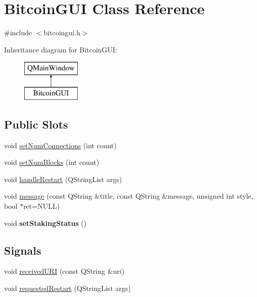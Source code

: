 \hypertarget{class_bitcoin_g_u_i}{}\section{Bitcoin\+G\+UI Class Reference}
\label{class_bitcoin_g_u_i}


{\ttfamily \#include $<$bitcoingui.\+h$>$}

Inheritance diagram for Bitcoin\+G\+UI\+:\begin{figure}[H]
\begin{center}
\leavevmode
\includegraphics[height=2.000000cm]{class_bitcoin_g_u_i}
\end{center}
\end{figure}
\subsection*{Public Slots}
\begin{DoxyCompactItemize}
\item 
void \mbox{\hyperlink{class_bitcoin_g_u_i_ae5b9dc62c6a52764a92cfacbe128626f}{set\+Num\+Connections}} (int count)
\item 
void \mbox{\hyperlink{class_bitcoin_g_u_i_ad9c5016f37aa52562c114527a63a2563}{set\+Num\+Blocks}} (int count)
\item 
void \mbox{\hyperlink{class_bitcoin_g_u_i_a0f9d1262e45413fa51a395d41f615917}{handle\+Restart}} (Q\+String\+List args)
\item 
void \mbox{\hyperlink{class_bitcoin_g_u_i_abf1d036341d1fb122398b2b78d2734ea}{message}} (const Q\+String \&title, const Q\+String \&message, unsigned int style, bool $\ast$ret=N\+U\+LL)
\item 
\mbox{\label{class_bitcoin_g_u_i_ae512b4ad46f9cba31be53de5a5c1d398}} 
void {\bfseries set\+Staking\+Status} ()
\end{DoxyCompactItemize}
\subsection*{Signals}
\begin{DoxyCompactItemize}
\item 
void \mbox{\hyperlink{class_bitcoin_g_u_i_a15d55a3b292c9eec64298797d262fa32}{received\+U\+RI}} (const Q\+String \&uri)
\item 
void \mbox{\hyperlink{class_bitcoin_g_u_i_aa16b27ff0eab480255ba86b7d0486034}{requested\+Restart}} (Q\+String\+List args)
\end{DoxyCompactItemize}
